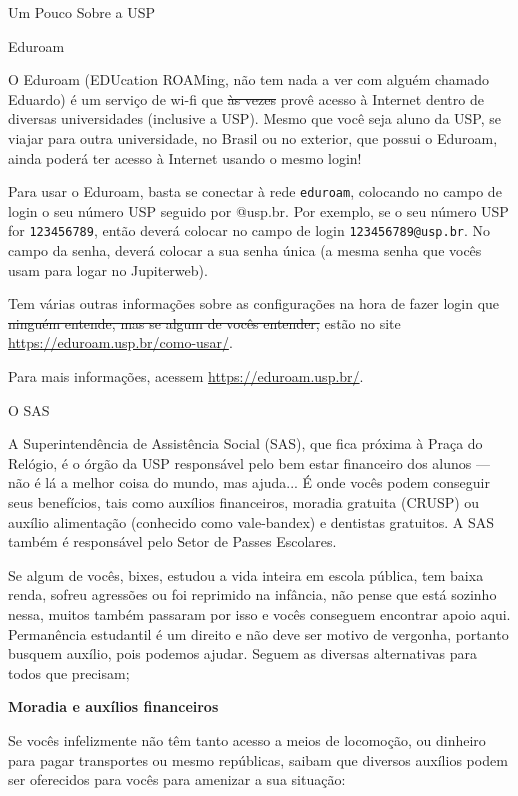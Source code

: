 \begin{secao}{Um Pouco Sobre a USP}
\begin{subsecao}{Eduroam}

O Eduroam (EDUcation ROAMing, não tem nada a ver com alguém chamado Eduardo) é um
serviço de wi-fi que \sout{às vezes} provê acesso à Internet dentro de diversas
universidades (inclusive a USP). Mesmo que você seja aluno da USP, se viajar para
outra universidade, no Brasil ou no exterior, que possui o Eduroam, ainda poderá ter
acesso à Internet usando o mesmo login!

Para usar o Eduroam, basta se conectar à rede \texttt{eduroam}, colocando no campo
de login o seu número USP seguido por @usp.br. Por exemplo, se o seu número USP for
\texttt{123456789}, então deverá colocar no campo de login \texttt{123456789@usp.br}.
No campo da senha, deverá colocar a sua senha única (a mesma senha que vocês usam
para logar no Jupiterweb).

Tem várias outras informações sobre as configurações na hora de fazer login que
\sout{ninguém entende, mas se algum de vocês entender,} estão no site
\url{https://eduroam.usp.br/como-usar/}.

Para mais informações, acessem \url{https://eduroam.usp.br/}.

\end{subsecao}

\begin{subsecao}{O SAS}

A Superintendência de Assistência Social (SAS), que fica próxima à Praça do
Relógio, é o órgão da USP responsável pelo bem estar financeiro dos alunos — não
é lá a melhor coisa do mundo, mas ajuda... É onde vocês podem conseguir seus
benefícios, tais como auxílios financeiros, moradia gratuita (CRUSP)
ou auxílio alimentação (conhecido como vale-bandex) e dentistas gratuitos.
A SAS também é responsável pelo Setor de Passes Escolares.

Se algum de vocês, bixes, estudou a vida inteira em escola pública, tem baixa renda,
sofreu agressões ou foi reprimido na infância, não pense que está sozinho nessa,
muitos também passaram por isso e vocês conseguem encontrar apoio aqui. Permanência
estudantil é um direito e não deve ser motivo de vergonha, portanto busquem
auxílio, pois podemos ajudar. Seguem as diversas alternativas para todos 
que precisam;

\textbf{Moradia e auxílios financeiros}

Se vocês infelizmente não têm tanto acesso a meios de locomoção, ou dinheiro para
pagar transportes ou mesmo repúblicas, saibam que diversos auxílios podem ser
oferecidos para vocês para amenizar a sua situação:


\end{subsecao}
\end{secao}
